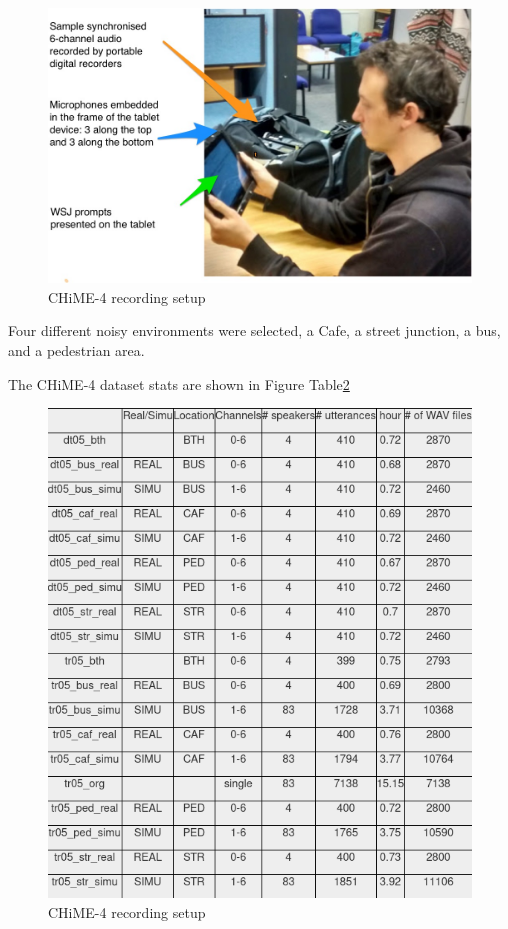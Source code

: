 \begin{figure}[H]
    \centering
    \includegraphics[width=0.75\linewidth]{Datasets/images/chime4_rec_device}
    \caption{CHiME-4 recording setup}\label{fig:chime4_rec_device}
\end{figure}

Four different noisy environments were selected, a Cafe, a street junction, a bus, and a pedestrian area.

The CHiME-4 dataset stats are shown in Figure Table\;\ref{fig:chime4_stats}

\begin{figure}[H]
    \centering
    \includegraphics[width=0.75\linewidth]{Datasets/images/chime4_stats}
    \caption{CHiME-4 recording setup}\label{fig:chime4_stats}
\end{figure}


